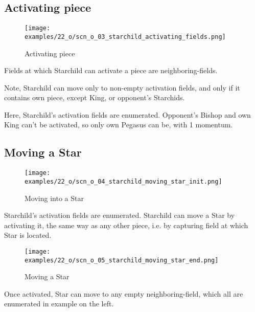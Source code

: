 \vspace*{1.1\baselineskip}
\subsection*{Activating piece}

\vspace*{-0.9\baselineskip}
\noindent
\begin{wrapfigure}[7]{l}{0.4\textwidth}
\centering
\texttt{[image: examples/22\_o/scn\_o\_03\_starchild\_activating\_fields.png]}
\caption{Activating piece}
\label{fig:scn_o_03_starchild_activating_fields}
\end{wrapfigure}
Fields at which Starchild can activate a piece are neighboring-fields.

Note, Starchild can move only to non-empty activation fields, and only if it contains
own piece, except King, or opponent's Starchids.

Here, Starchild’s activation fields are enumerated. Opponent's Bishop and own King can't
be activated, so only own Pegasus can be, with 1 momentum.

\vspace*{-1.1\baselineskip}
\subsection*{Moving a Star}

\vspace*{-0.9\baselineskip}
\noindent
\begin{wrapfigure}[5]{l}{0.4\textwidth}
\centering
\texttt{[image: examples/22\_o/scn\_o\_04\_starchild\_moving\_star\_init.png]}
\caption{Moving into a Star}
\label{fig:scn_o_04_starchild_moving_star_init}
\end{wrapfigure}
Starchild's activation fields are enumerated. Starchild can move a Star by activating it,
the same way as any other piece, i.e. by capturing field at which Star is located.

\clearpage %

\noindent
\begin{wrapfigure}[4]{l}{0.4\textwidth}
\centering
\texttt{[image: examples/22\_o/scn\_o\_05\_starchild\_moving\_star\_end.png]}
\caption{Moving a Star}
\label{fig:scn_o_05_starchild_moving_star_end}
\end{wrapfigure}
Once activated, Star can move to any empty neighboring-field, which all are enumerated in
example on the left.


